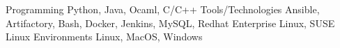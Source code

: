 

\begin{cvskills}


 \cvskill 
     {Programming} %
     {Python, Java, Ocaml, C/C++} %
 \cvskill
     {Tools/Technologies} %
     {Ansible, Artifactory, Bash, Docker, Jenkins, MySQL, Redhat Enterprise Linux, SUSE Linux }
 \cvskill
     {Environments}  %
     {Linux, MacOS, Windows} %
    

\end{cvskills}
